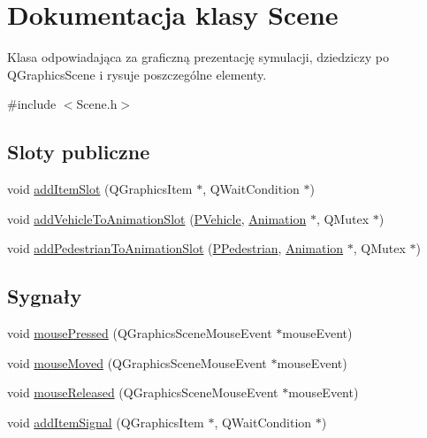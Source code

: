\hypertarget{class_scene}{\section{Dokumentacja klasy Scene}
\label{class_scene}
}


Klasa odpowiadająca za graficzną prezentację symulacji, dziedziczy po Q\-Graphics\-Scene i rysuje poszczególne elementy.  




{\ttfamily \#include $<$Scene.\-h$>$}

\subsection*{Sloty publiczne}
\begin{DoxyCompactItemize}
\item 
void \hyperlink{class_scene_a184c9be4892411819742a9fd70e8333b}{add\-Item\-Slot} (Q\-Graphics\-Item $\ast$, Q\-Wait\-Condition $\ast$)
\item 
void \hyperlink{class_scene_ad35ef97681da43e764a5303e77e3844d}{add\-Vehicle\-To\-Animation\-Slot} (\hyperlink{_types_8h_a564207d327881e8bcfa0843e1a874756}{P\-Vehicle}, \hyperlink{class_animation}{Animation} $\ast$, Q\-Mutex $\ast$)
\item 
void \hyperlink{class_scene_a8b99a0335933b1ac07b032c349952788}{add\-Pedestrian\-To\-Animation\-Slot} (\hyperlink{_types_8h_a6ca5cb67bb3df872d4650820dbc647b8}{P\-Pedestrian}, \hyperlink{class_animation}{Animation} $\ast$, Q\-Mutex $\ast$)
\end{DoxyCompactItemize}
\subsection*{Sygnały}
\begin{DoxyCompactItemize}
\item 
void \hyperlink{class_scene_a15683b9f4afcdc10bde922fab5f4a951}{mouse\-Pressed} (Q\-Graphics\-Scene\-Mouse\-Event $\ast$mouse\-Event)
\item 
void \hyperlink{class_scene_a4c6c8254c928419b74aa95fa3bb1c534}{mouse\-Moved} (Q\-Graphics\-Scene\-Mouse\-Event $\ast$mouse\-Event)
\item 
void \hyperlink{class_scene_a9d8b2c7b7d91f001421e95734934be06}{mouse\-Released} (Q\-Graphics\-Scene\-Mouse\-Event $\ast$mouse\-Event)
\item 
void \hyperlink{class_scene_a7e2a3ec20454137ea1c0512afd56a639}{add\-Item\-Signal} (Q\-Graphics\-Item $\ast$, Q\-Wait\-Condition $\ast$)
\end{DoxyCompactItemize}
